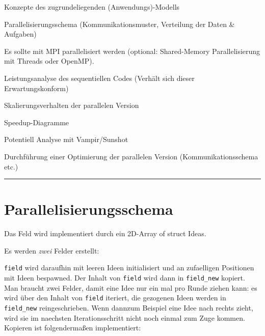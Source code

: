 Konzepte des zugrundeliegenden (Anwendungs)-Modells

Parallelisierungsschema (Kommunikationsmuster, Verteilung der Daten \&
Aufgaben)

Es sollte mit MPI parallelisiert werden (optional: Shared-Memory
Parallelisierung mit Threads oder OpenMP).

Leistungsanalyse des sequentiellen Codes (Verhält sich dieser
Erwartungskonform)

Skalierungsverhalten der parallelen Version

Speedup-Diagramme

Potentiell Analyse mit Vampir/Sunshot

Durchführung einer Optimierung der parallelen Version
(Kommunikationsschema etc.)

\begin{center}\rule{3in}{0.4pt}\end{center}

\section{Parallelisierungsschema}\label{parallelisierungsschema}

Das Feld wird implementiert durch ein 2D-Array of struct Ideas.

\begin{Shaded}
\begin{Highlighting}[]
     \NormalTok{(} 
\end{Highlighting}
\end{Shaded}

Es werden \emph{zwei} Felder erstellt:

\begin{Shaded}
\begin{Highlighting}[]
\end{Highlighting}
\end{Shaded}

\texttt{field} wird daraufhin mit leeren Ideen initialisiert und an
zufaelligen Positionen mit Ideen bespawned. Der Inhalt von
\texttt{field} wird dann in \texttt{field\_new} kopiert. Man braucht
zwei Felder, damit eine Idee nur ein mal pro Runde ziehen kann: es wird
über den Inhalt von \texttt{field} iteriert, die gezogenen Ideen werden
in \texttt{field\_new} reingeschrieben. Wenn dannzum Beispiel eine Idee
nach rechts zieht, wird sie im naechsten Iterationsschritt nicht noch
einmal zum Zuge kommen. Kopieren ist folgendermaßen implementiert:

